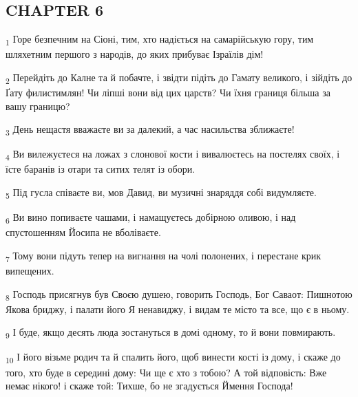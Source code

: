 \subsection{CHAPTER 6}
\begin{tcolorbox}
\textsubscript{1} Горе безпечним на Сіоні, тим, хто надіється на самарійськую гору, тим шляхетним першого з народів, до яких прибуває Ізраїлів дім!
\end{tcolorbox}
\begin{tcolorbox}
\textsubscript{2} Перейдіть до Калне та й побачте, і звідти підіть до Гамату великого, і зійдіть до Ґату филистимлян! Чи ліпші вони від цих царств? Чи їхня границя більша за вашу границю?
\end{tcolorbox}
\begin{tcolorbox}
\textsubscript{3} День нещастя вважаєте ви за далекий, а час насильства зближаєте!
\end{tcolorbox}
\begin{tcolorbox}
\textsubscript{4} Ви вилежуєтеся на ложах з слонової кости і вивалюєтесь на постелях своїх, і їсте баранів із отари та ситих телят із обори.
\end{tcolorbox}
\begin{tcolorbox}
\textsubscript{5} Під гусла співаєте ви, мов Давид, ви музичні знаряддя собі видумляєте.
\end{tcolorbox}
\begin{tcolorbox}
\textsubscript{6} Ви вино попиваєте чашами, і намащуєтесь добірною оливою, і над спустошенням Йосипа не вболіваєте.
\end{tcolorbox}
\begin{tcolorbox}
\textsubscript{7} Тому вони підуть тепер на вигнання на чолі полонених, і перестане крик випещених.
\end{tcolorbox}
\begin{tcolorbox}
\textsubscript{8} Господь присягнув був Своєю душею, говорить Господь, Бог Саваот: Пишнотою Якова бриджу, і палати його Я ненавиджу, і видам те місто та все, що є в ньому.
\end{tcolorbox}
\begin{tcolorbox}
\textsubscript{9} І буде, якщо десять люда зостануться в домі одному, то й вони повмирають.
\end{tcolorbox}
\begin{tcolorbox}
\textsubscript{10} І його візьме родич та й спалить його, щоб винести кості із дому, і скаже до того, хто буде в середині дому: Чи ще є хто з тобою? А той відповість: Вже немає нікого! і скаже той: Тихше, бо не згадується Ймення Господа!
\end{tcolorbox}
